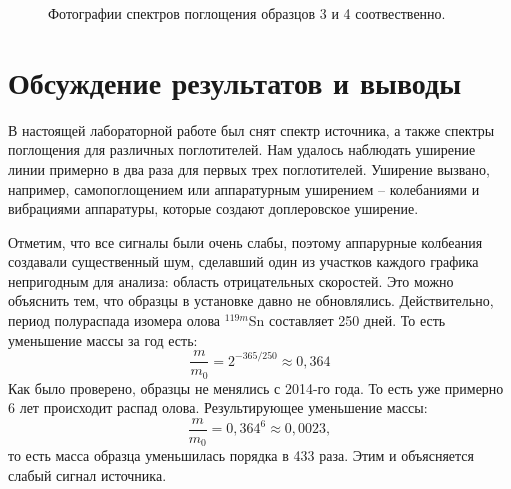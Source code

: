 \documentclass[a4paper,12pt]{article} %
\begin{document}
\begin{figure}[h!]
{\begin{subfloatrow}[2]
		\end{subfloatrow}}
		{\caption{Фотографии спектров поглощения образцов 3 и 4 соотвественно.}}
	\end{figure}


\newpage
\section{Обсуждение результатов и выводы}
	В настоящей лабораторной работе был снят спектр источника, а также спектры поглощения для различных поглотителей. Нам удалось наблюдать уширение линии примерно в два раза для первых трех поглотителей. Уширение вызвано, например, самопоглощением или аппаратурным уширением -- колебаниями и вибрациями аппаратуры, которые создают доплеровское уширение.
	
	Отметим, что все сигналы были очень слабы, поэтому аппарурные колбеания создавали существенный шум, сделавший один из участков каждого графика непригодным для анализа: область отрицательных скоростей. Это можно объяснить тем, что образцы в установке давно не обновлялись. Действительно, период полураспада изомера олова $^{119m}$Sn составляет 250 дней. То есть уменьшение массы за год есть:
	\begin{equation*}
		\frac{m}{m_0} = 2^{-365/250} \approx 0,364
	\end{equation*}
	Как было проверено, образцы не менялись с 2014-го года. То есть уже примерно 6 лет происходит распад олова. Результирующее уменьшение массы:
	\begin{equation*}
		\frac{m}{m_0} = 0,364^6 \approx 0,0023,
	\end{equation*}
	то есть масса образца уменьшилась порядка в 433 раза. Этим и объясняется слабый сигнал источника.
\end{document}
